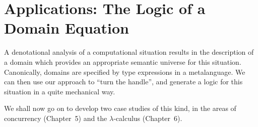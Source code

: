 \section{Applications: The Logic of a Domain Equation}
A denotational analysis of a computational situation results in the
description of a domain which provides an appropriate semantic universe
for this situation.
Canonically, domains are specified by type expressions in a metalanguage.
We can then use our approach to ``turn the handle'', and generate 
a logic for this situation in a quite mechanical way.

We shall now go on to develop two case studies of this kind, in the areas of concurrency (Chapter~5) and the $\lambda$-calculus (Chapter~6).
